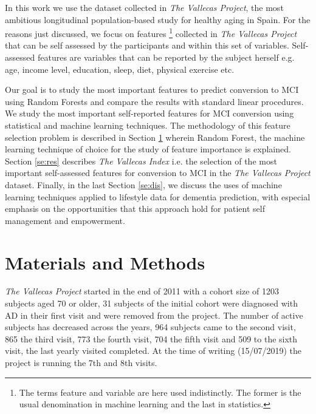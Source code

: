 \documentclass[preprint,12pt]{elsarticle}
\begin{document}
In this work we use the dataset collected in \emph{The Vallecas Project}, the most ambitious longitudinal population-based study for healthy aging in Spain. For the reasons just discussed, we focus on features \footnote{The terms feature and variable are here used indistinctly. The former is the usual denomination in  machine learning and the last in statistics.} collected in \emph{The Vallecas Project} that can be self assessed by the participants and within this set of variables. Self-assessed features are variables that can be reported by the subject herself e.g. age, income level, education, sleep, diet, physical exercise etc.

Our goal is to study the most important features to predict conversion to MCI using Random Forests and compare the results with standard linear procedures. We study the most important self-reported features for MCI conversion using statistical and machine learning techniques. The methodology of this feature selection problem is described in Section \ref{se:mandm} wherein Random Forest, the machine learning technique of choice for the study of feature importance is explained.
Section \ref{se:res} describes \emph{The Vallecas Index} i.e. the selection of the most important self-assessed features for conversion to MCI in the \emph{The Vallecas Project} dataset. Finally, in the last Section \ref{se:dis}, we discuss the uses of machine learning techniques applied to lifestyle data for dementia prediction, with especial emphasis on the opportunities that this approach hold for patient self management and empowerment. 

\section{Materials and Methods}
\label{se:mandm}

\emph{The Vallecas Project} started in the end of 2011 with a cohort size of 1203 subjects aged 70 or older, 31 subjects of the initial cohort were diagnosed with AD in their first visit and were removed from the project. The number of active subjects has decreased across the years, 964 subjects came to the second visit, 865 the third visit, 773 the fourth visit, 704 the fifth visit and 509 to the sixth visit, the last yearly visited completed. At the time of writing (15/07/2019) the project is running the 7th and 8th visits.
\end{document}
